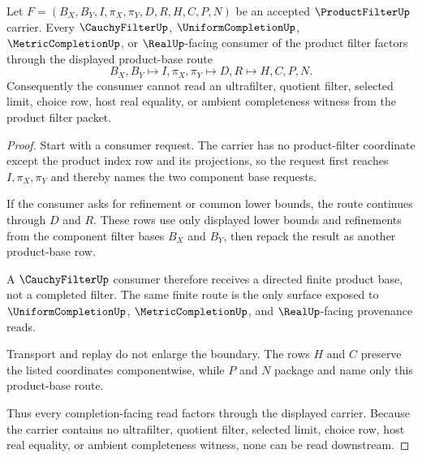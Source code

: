 \begin{theorem}
\label{thm:product-filter-completion-handoff}
Let $F=(B_X,B_Y,I,\pi_X,\pi_Y,D,R,H,C,P,N)$ be an accepted $\ProductFilterUp$ carrier. Every $\CauchyFilterUp$, $\UniformCompletionUp$, $\MetricCompletionUp$, or $\RealUp$-facing consumer of the product filter factors through the displayed product-base route
$$
B_X,B_Y \longmapsto I,\pi_X,\pi_Y \longmapsto D,R \longmapsto H,C,P,N .
$$
Consequently the consumer cannot read an ultrafilter, quotient filter, selected limit, choice row, host real equality, or ambient completeness witness from the product filter packet.
\end{theorem}
\begin{proof}
Start with a consumer request. The carrier has no product-filter coordinate except the product index row and its projections, so the request first reaches $I,\pi_X,\pi_Y$ and thereby names the two component base requests.

If the consumer asks for refinement or common lower bounds, the route continues through $D$ and $R$. These rows use only displayed lower bounds and refinements from the component filter bases $B_X$ and $B_Y$, then repack the result as another product-base row.

A $\CauchyFilterUp$ consumer therefore receives a directed finite product base, not a completed filter. The same finite route is the only surface exposed to $\UniformCompletionUp$, $\MetricCompletionUp$, and $\RealUp$-facing provenance reads.

Transport and replay do not enlarge the boundary. The rows $H$ and $C$ preserve the listed coordinates componentwise, while $P$ and $N$ package and name only this product-base route.

Thus every completion-facing read factors through the displayed carrier. Because the carrier contains no ultrafilter, quotient filter, selected limit, choice row, host real equality, or ambient completeness witness, none can be read downstream.
\end{proof}



